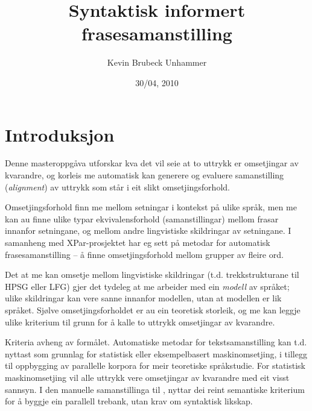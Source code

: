 \documentclass[11pt,a4paper,oneside,draft]{book}
\title{Syntaktisk informert frasesamanstilling }
\author{Kevin Brubeck Unhammer}
\date{30/04, 2010}
\begin{document}
\maketitle

\setcounter{tocdepth}{4}
\tableofcontents
\vspace*{1cm}

\listoffixmes

\chapter{Introduksjon}
\label{sec-1}

\label{SEC:introduksjon}


Denne masteroppgåva utforskar kva det vil seie at to uttrykk er
omsetjingar av kvarandre, og korleis me automatisk kan generere og
evaluere samanstilling (\emph{alignment}) av uttrykk som
står i eit slikt omsetjingsforhold. 

Omsetjingsforhold finn me mellom setningar i kontekst på ulike språk,
men me kan au finne ulike typar ekvivalensforhold (samanstillingar)
mellom frasar innanfor setningane, og mellom andre lingvistiske
skildringar av setningane. I samanheng med XPar-prosjektet
\citep{xpar2008rcn} har eg sett på metodar for automatisk
frasesamanstilling – å finne omsetjingsforhold mellom grupper av
fleire ord.



Det at me kan omsetje mellom lingvistiske skildringar
(t.d. trekkstrukturane til HPSG eller LFG) gjer det tydeleg at me
arbeider med ein \emph{modell} av språket; ulike skildringar kan vere sanne
innanfor modellen, utan at modellen er lik språket. Sjølve
omsetjingsforholdet er au ein teoretisk storleik, og me kan leggje
ulike kriterium til grunn for å kalle to uttrykk omsetjingar av
kvarandre.

Kriteria avheng av formålet. Automatiske metodar for
tekstsamanstilling kan t.d. nyttast som grunnlag for statistisk eller
eksempelbasert maskinomsetjing, i tillegg til oppbygging av parallelle
korpora for meir teoretiske språkstudie.  For statistisk
maskinomsetjing vil alle uttrykk vere omsetjingar av kvarandre med eit
visst sannsyn. I den manuelle samanstillinga til
\citet{samuelsson2006pap}, nyttar dei reint semantiske kriterium for å
byggje ein parallell trebank, utan krav om syntaktisk likskap.
\end{document}
